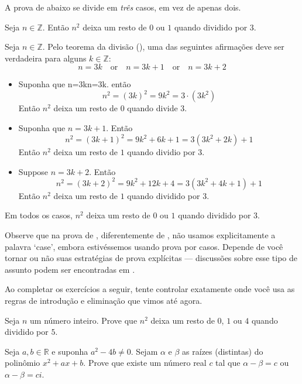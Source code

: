 \begin{estratégia}
A prova de  abaixo se divide em \textit{três} casos, em vez de apenas dois.

\begin{proposition}
\label{propRemainderOfSquaresModulo3}
Seja $n \in \mathbb{Z}$. Então $n^2$ deixa um resto de $0$ ou $1$ quando dividido por $3$.
\end{proposition}

\begin{cproof}
Seja $n \in \mathbb{Z}$. Pelo teorema da divisão (), uma das seguintes afirmações deve ser verdadeira para alguns $k \in \mathbb{Z}$:
\[
n=3k \quad \text{or} \quad n=3k+1 \quad \text{or} \quad n=3k+2
\]
\begin{itemize}
\item Suponha que n=3kn=3k. então
\[
n^2 = (3k)^2 = 9k^2 = 3 \cdot (3k^2)
\]
Então $n^2$ deixa um resto de $0$ quando divide $3$.
\item Suponha que $n=3k+1$. Então
\[
n^2 = (3k+1)^2 = 9k^2+6k+1 = 3(3k^2+2k)+1
\]
Então $n^2$ deixa um resto de $1$ quando dividio por $3$.
\item Suppose $n=3k+2$. Então
\[
n^2 = (3k+2)^2 = 9k^2+12k+4 = 3(3k^2+4k+1)+1
\]
Então $n^2$ deixa um resto de $1$ quando dividido por $3$.
\end{itemize}
Em todos os casos, $n^2$ deixa um resto de $0$ ou $1$ quando dividido por $3$.
\end{cproof}

Observe que na prova de , diferentemente de , não usamos explicitamente a palavra `case', embora estivéssemos usando prova por casos. Depende de você tornar ou não suas estratégias de prova explícitas --- discussões sobre esse tipo de assunto podem ser encontradas em .

Ao completar os exercícios a seguir, tente controlar exatamente onde você usa as regras de introdução e eliminação que vimos até agora.

\begin{exercise}
Seja $n$ um número inteiro. Prove que $n^2$ deixa um resto de $0$, $1$ ou $4$ quando dividido por $5$.
\end{exercise}

\begin{exercise}
Seja $a,b \in \mathbb{R}$ e suponha $a^2-4b \ne 0$. Sejam $\alpha$ e $\beta$ as raízes (distintas) do polinômio $x^2+ax+b$. Prove que existe um número real $c$ tal que $\alpha-\beta = c$ ou $\alpha - \beta = ci$.
\end{exercise}


\end{estratégia}
